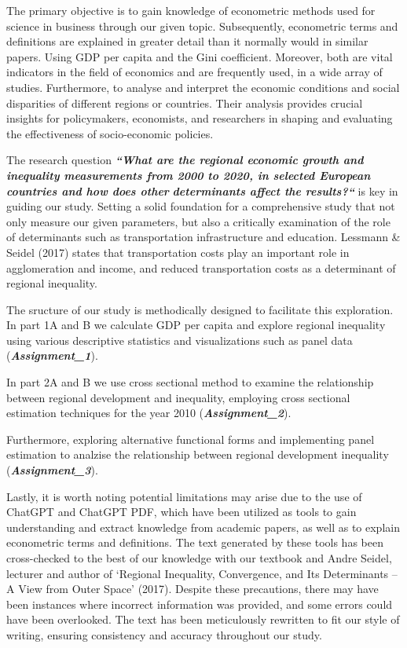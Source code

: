 \documentclass[
  a4paper,
  DIV=11,
  numbers=noendperiod]{scrartcl}
\begin{document}
The primary objective is to gain knowledge of econometric methods used
for science in business through our given topic. Subsequently,
econometric terms and definitions are explained in greater detail than
it normally would in similar papers. Using GDP per capita and the Gini
coefficient. Moreover, both are vital indicators in the field of
economics and are frequently used, in a wide array of studies.
Furthermore, to analyse and interpret the economic conditions and social
disparities of different regions or countries. Their analysis provides
crucial insights for policymakers, economists, and researchers in
shaping and evaluating the effectiveness of socio-economic policies.

The research question \textbf{\emph{``What are the regional economic
growth and inequality measurements from 2000 to 2020, in selected
European countries and how does other}} \textbf{\emph{determinants
affect the results?{}``}} is key in guiding our study. Setting a solid
foundation for a comprehensive study that not only measure our given
parameters, but also a critically examination of the role of
determinants such as transportation infrastructure and education.
Lessmann \& Seidel (2017) states that transportation costs play an
important role in agglomeration and income, and reduced transportation
costs as a determinant of regional inequality.

The sructure of our study is methodically designed to facilitate this
exploration. In part 1A and B we calculate GDP per capita and explore
regional inequality using various descriptive statistics and
visualizations such as panel data (\textbf{\emph{Assignment\_1}}).

In part 2A and B we use cross sectional method to examine the
relationship between regional development and inequality, employing
cross sectional estimation techniques for the year 2010
(\textbf{\emph{Assignment\_2}}).

Furthermore, exploring alternative functional forms and implementing
panel estimation to analzise the relationship between regional
development inequality (\textbf{\emph{Assignment\_3}}).

Lastly, it is worth noting potential limitations may arise due to the
use of ChatGPT and ChatGPT PDF, which have been utilized as tools to
gain understanding and extract knowledge from academic papers, as well
as to explain econometric terms and definitions. The text generated by
these tools has been cross-checked to the best of our knowledge with our
textbook and Andre Seidel, lecturer and author of `Regional Inequality,
Convergence, and Its Determinants -- A View from Outer Space' (2017).
Despite these precautions, there may have been instances where incorrect
information was provided, and some errors could have been overlooked.
The text has been meticulously rewritten to fit our style of writing,
ensuring consistency and accuracy throughout our study.
\end{document}
